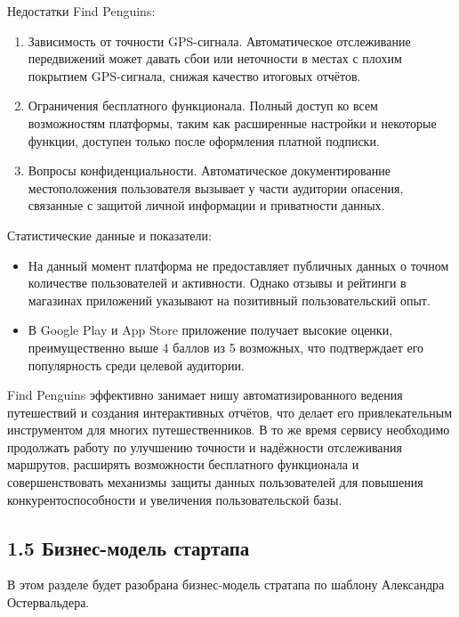 \noindent Недостатки Find Penguins:
\begin{enumerate}
    \item Зависимость от точности GPS-сигнала. Автоматическое отслеживание передвижений может давать сбои или неточности в местах с плохим покрытием GPS-сигнала, снижая качество итоговых отчётов.
    \item Ограничения бесплатного функционала. Полный доступ ко всем возможностям платформы, таким как расширенные настройки и некоторые функции, доступен только после оформления платной подписки.
    \item Вопросы конфиденциальности. Автоматическое документирование местоположения пользователя вызывает у части аудитории опасения, связанные с защитой личной информации и приватности данных.
\end{enumerate}

\noindent Статистические данные и показатели:
\begin{itemize}
    \item На данный момент платформа не предоставляет публичных данных о точном количестве пользователей и активности. Однако отзывы и рейтинги в магазинах приложений указывают на позитивный пользовательский опыт.
    \item В Google Play и App Store приложение получает высокие оценки, преимущественно выше 4 баллов из 5 возможных, что подтверждает его популярность среди целевой аудитории.
\end{itemize}

\noindent Find Penguins эффективно занимает нишу автоматизированного ведения путешествий и создания интерактивных отчётов, что делает его привлекательным инструментом для многих путешественников. В то же время сервису необходимо продолжать работу по улучшению точности и надёжности отслеживания маршрутов, расширять возможности бесплатного функционала и совершенствовать механизмы защиты данных пользователей для повышения конкурентоспособности и увеличения пользовательской базы.

\subsection*{1.5 Бизнес-модель стартапа}
В этом разделе будет разобрана бизнес-модель стратапа по шаблону Александра Остервальдера.

